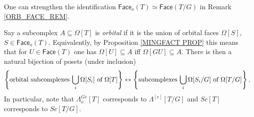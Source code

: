 \documentclass[a4paper,10pt
,draft
]{article}%
\begin{document}
\begin{remark}\label{ORB_HORN_REM}
One can strengthen the identification 
$\mathsf{Face}_o(T) \simeq \mathsf{Face}(T/G)$
in Remark \ref{ORB_FACE_REM}.

Say a subcomplex $A \subseteq \Omega[T]$ is \textit{orbital}
if it is the union of orbital faces $\Omega[S]$, $S\in \mathsf{Face}_o(T)$. 
Equivalently, by Proposition \ref{MINGFACT PROP} this means that for $U \in \mathsf{Face}(T)$
one has $\Omega[U] \subseteq A$ iff $\Omega[GU] \subseteq A$. There is then a natural bijection 
of posets (under inclusion)
\begin{equation}
	\left\{
	\text{orbital subcomplexes $\bigcup_i\Omega[S_i]$ of $\Omega[T]$}\right\}
		\leftrightarrow
	\left\{\text{subcomplexes $\bigcup_i\Omega[S_i/G]$ of $\Omega[T/G]$}\right\}.
\end{equation}
In particular, note that $\Lambda^{Ge}_o[T]$ corresponds to $\Lambda^{[e]}[T/G]$
and $Sc[T]$ corresponds to $Sc[T/G]$.
\end{remark}
\end{document}
